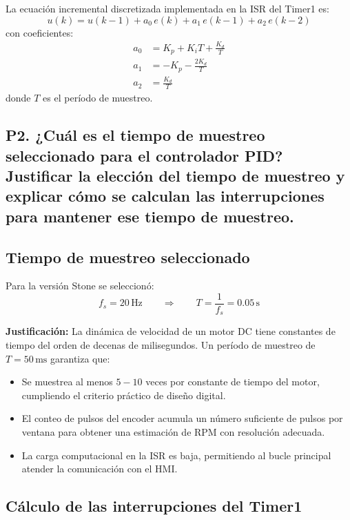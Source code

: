 \documentclass[journal, onecolumn]{IEEEtran}
\begin{document}
La ecuación incremental discretizada implementada en la ISR del Timer1 es:
\begin{equation}
  u(k) = u(k-1) + a_0\,e(k) + a_1\,e(k-1) + a_2\,e(k-2)
  \label{eq:pid_incr}
\end{equation}
con coeficientes:
\begin{align}
  a_0 &= K_p + K_i T + \frac{K_d}{T} \\
  a_1 &= -K_p - \frac{2K_d}{T} \\
  a_2 &= \frac{K_d}{T}
\end{align}
donde $T$ es el período de muestreo.



\subsection*{P2. ¿Cuál es el tiempo de muestreo seleccionado para el controlador PID? Justificar la elección del tiempo de muestreo y explicar cómo se calculan las interrupciones para mantener ese tiempo de muestreo.}

\subsection{Tiempo de muestreo seleccionado}

Para la versión Stone se seleccionó:
\[
  f_s = 20\,\text{Hz} \qquad \Longrightarrow \qquad T = \frac{1}{f_s} = 0.05\,\text{s}
\]

\textbf{Justificación:} La dinámica de velocidad de un motor DC tiene
constantes de tiempo del orden de decenas de milisegundos. Un período de
muestreo de $T = 50\,\text{ms}$ garantiza que:
\begin{itemize}
  \item Se muestrea al menos $5{-}10$ veces por constante de tiempo del motor,
        cumpliendo el criterio práctico de diseño digital.
  \item El conteo de pulsos del encoder acumula un número suficiente de pulsos
        por ventana para obtener una estimación de RPM con resolución adecuada.
  \item La carga computacional en la ISR es baja, permitiendo al bucle
        principal atender la comunicación con el HMI.
\end{itemize}

\subsection{Cálculo de las interrupciones del Timer1}
\end{document}
